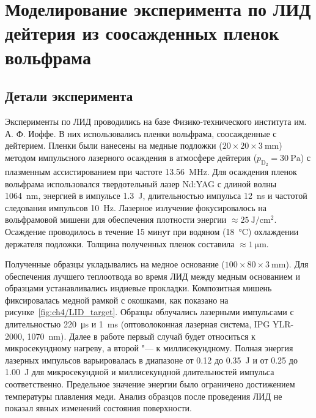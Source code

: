 \section{Моделирование эксперимента по ЛИД дейтерия из соосажденных пленок вольфрама}\label{sec:ch4/sec1}

\subsection{Детали эксперимента}\label{subsec:ch4/sec1/subsec1}

Эксперименты по ЛИД проводились на базе Физико-технического института им. А. Ф. Иоффе. В них использовались пленки вольфрама, соосажденные с дейтерием. Пленки были нанесены на медные подложки ($20 \times 20 \times \SI{3}{\milli\metre}$) методом импульсного лазерного осаждения в атмосфере дейтерия (\(p_\mathrm{D_2}=\SI{30}{\pascal}\)) с плазменным ассистированием при частоте \SI{13.56}{\mega\hertz}. Для осаждения пленок вольфрама использовался твердотельный лазер Nd:YAG с длиной волны \SI{1064}{\nano\meter}, энергией в импульсе \SI{1.3}{\joule}, длительностью импульса \SI{12}{\nano\second} и частотой следования импульсов \SI{10}{\hertz}. Лазерное излучение фокусировалось на вольфрамовой мишени для обеспечения плотности энергии $\approx\SI{25}{\joule\per\centi\meter\squared}$. Осаждение проводилось в течение 15 минут при водяном (\SI{18}{\degreeCelsius}) охлаждении держателя подложки. Толщина полученных пленок составила $\approx\SI{1}{\micro\metre}$.

Полученные образцы укладывались на медное основание ($100 \times 80 \times \SI{3}{\milli\metre}$). Для обеспечения лучшего теплоотвода во время ЛИД между медным основанием и образцами устанавливались индиевые прокладки. Композитная мишень фиксировалась медной рамкой с окошками, как показано на рисунке~\cref{fig:ch4/LID_target}. Образцы облучались лазерными импульсами с длительностью \SI{220}{\micro\second} и \SI{1}{\milli\second} (оптоволоконная лазерная система, IPG YLR-2000, \SI{1070}{\nano\metre}). Далее в работе первый случай будет относиться к микросекундному нагреву, а второй "--- к миллисекундному. Полная энергия лазерных импульсов варьировалась в диапазоне от \num{0.12} до \SI{0.35}{\joule} и от \num{0.25} до \SI{1.00}{\joule} для микросекундной и миллисекундной длительностей импульса соответственно. Предельное значение энергии было ограничено достижением температуры плавления меди. Анализ образцов после проведения ЛИД не показал явных изменений состояния поверхности.

